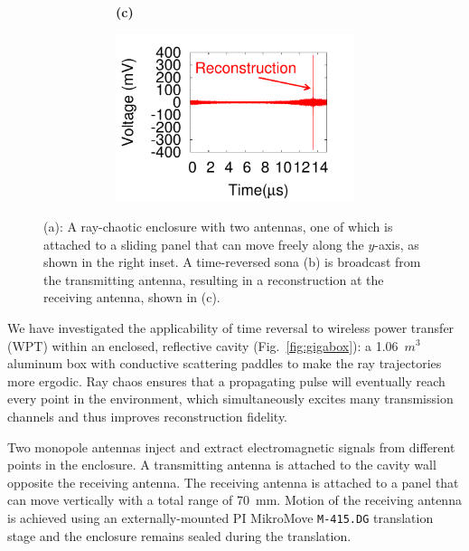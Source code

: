 \begin{figure}[]
\begin{subfigure}[]{0.9\columnwidth}
\begin{subfigure}[t]{0.45\columnwidth}
				\caption{\label{fig:sona}}
		\end{subfigure}
	\begin{subfigure}[t]{0.03\columnwidth}
	\textbf{(c)}
	\end{subfigure}
		\begin{subfigure}[t]{0.45\columnwidth}
				\centering
				\includegraphics[width=\columnwidth,valign=t]{figs/recon.pdf}
				\caption{\label{fig:recon}}
		\end{subfigure}
	\end{subfigure}
  \vspace{-1\baselineskip}
	\caption{(a): A ray-chaotic enclosure with two antennas, one of
	which is attached to a sliding panel that can move freely along the $y$-axis,
	as shown in the right inset. A time-reversed sona (b) is broadcast from the
	transmitting antenna, resulting in a reconstruction at the receiving
	antenna, shown in (c).}
	\label{fig:setup}
\vspace{-0.5\baselineskip}
\end{figure}


We have investigated the applicability of time reversal to wireless power
transfer (WPT) within an enclosed, reflective cavity (Fig.~\ref{fig:gigabox}): a
1.06~$m^3$ aluminum box with conductive scattering paddles to make the ray
trajectories more ergodic.
%
Ray chaos ensures that a propagating pulse will eventually reach every point in
the environment, which simultaneously excites many transmission channels
and thus improves reconstruction fidelity.



Two monopole antennas inject and extract electromagnetic signals from different
points in the enclosure. A transmitting antenna is attached to the cavity wall
opposite the receiving antenna.
%
The receiving antenna is attached to a panel that can move vertically with a
total range of 70~mm.
%
Motion of the receiving antenna is achieved using an externally-mounted PI
MikroMove \texttt{M-415.DG} translation stage and the enclosure remains sealed
during the translation.



